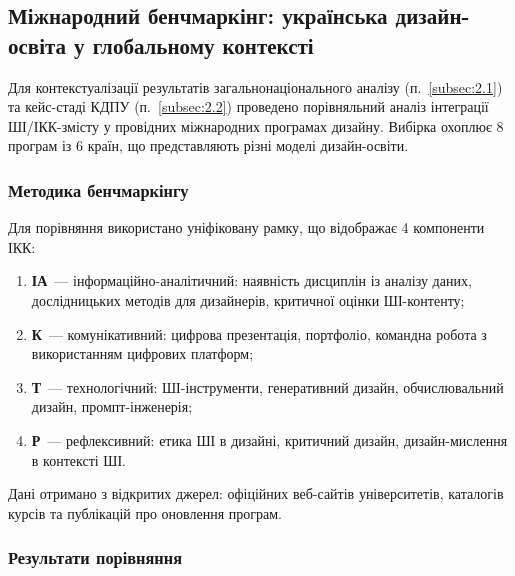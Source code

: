 \subsection{Міжнародний бенчмаркінг: українська дизайн-освіта у глобальному контексті}\label{subsec:2.3}

Для контекстуалізації результатів загальнонаціонального аналізу (п.~\ref{subsec:2.1}) та кейс-стаді КДПУ (п.~\ref{subsec:2.2}) проведено порівняльний аналіз інтеграції ШІ/ІКК-змісту у провідних міжнародних програмах дизайну. Вибірка охоплює 8 програм із 6 країн, що представляють різні моделі дизайн-освіти.

\subsubsection{Методика бенчмаркінгу}\label{sssec:2.3.1}

Для порівняння використано уніфіковану рамку, що відображає 4 компоненти ІКК:
\begin{enumerate}
    \item \textbf{ІА}~--- інформаційно-аналітичний: наявність дисциплін із аналізу даних, дослідницьких методів для дизайнерів, критичної оцінки ШІ-контенту;
    \item \textbf{К}~--- комунікативний: цифрова презентація, портфоліо, командна робота з використанням цифрових платформ;
    \item \textbf{Т}~--- технологічний: ШІ-інструменти, генеративний дизайн, обчислювальний дизайн, промпт-інженерія;
    \item \textbf{Р}~--- рефлексивний: етика ШІ в дизайні, критичний дизайн, дизайн-мислення в контексті ШІ.
\end{enumerate}

Дані отримано з відкритих джерел: офіційних веб-сайтів університетів, каталогів курсів та публікацій про оновлення програм.

\subsubsection{Результати порівняння}\label{sssec:2.3.2}

